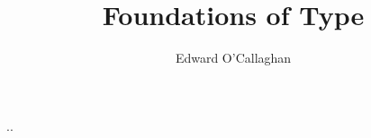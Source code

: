 \documentclass{book}
\title{Foundations of Type}
\author{Edward O'Callaghan}
\date{}
\begin{document}
\maketitle \tableofcontents \clearpage

..
\end{document}
